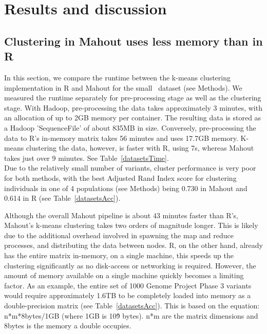 \documentclass{bioinfo}
\begin{document}


\section*{Results and discussion}


\subsection*{Clustering in Mahout uses less memory than in R}
In this section, we compare the runtime between the k-means clustering implementation in R and Mahout for the small \NinteenPhaseone\ dataset (see Methods). 
We measured the runtime separately for pre-processing stage as well as the clustering stage. 
With Hadoop, pre-processing the data takes approximately 3 minutes, with an allocation of up to 2GB memory per container. The resulting data is stored as a Hadoop 'SequenceFile' of about 835MB in size.
Conversely,  pre-processing the data to R's in-memory matrix takes 56 minutes and uses 17.7GB memory. 
K-means clustering the data, however, is faster with R, using 7s, whereas Mahout takes just over 9 minutes. See Table~\ref{datasetsTime}. \\
Due to the relatively small number of variants, cluster performance is very poor for both methods, with the best Adjusted Rand Index score for clustering individuals in one of 4 populations (see Methods) being 0.730 in Mahout and 0.614 in R (see Table~\ref{datasetsAcc}).

Although the overall Mahout pipeline is about 43 minutes faster than R's, Mahout's k-means clustering takes two orders of magnitude longer. 
This is likely due to the additional overhead involved in spawning the map and reduce processes, and distributing the data between nodes.
R, on the other hand, already has the entire matrix in-memory, on a single machine, this speeds up the clustering significantly as no disk-access or networking is required. However, the amount of memory available on a single machine quickly becomes a limiting factor. 
As an example, the entire set of 1000 Genome Project Phase 3 variants would require approximately 1.6TB to be completely loaded into memory as a double-precision matrix (see Table~\ref{datasetsAcc}). This is based on the equation: n*m*8bytes/1GB (where 1GB is 10\^9 bytes). n*m are the matrix dimensions and 8bytes is the memory a double occupies.
\end{document}
